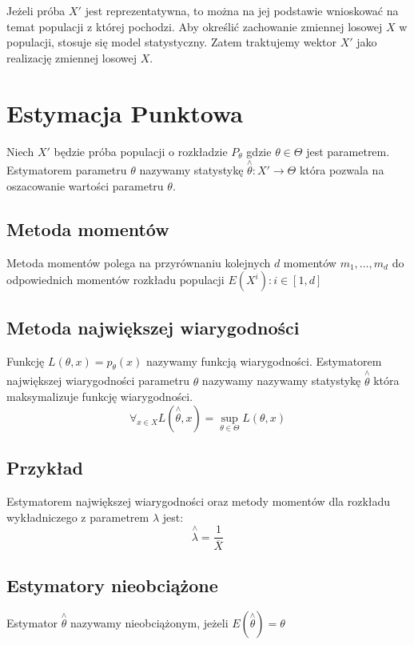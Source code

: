 \documentclass{../notatki}
\begin{document}
Jeżeli próba $X'$ jest reprezentatywna, to można na jej podstawie
wnioskować na temat populacji z której pochodzi. Aby określić zachowanie
zmiennej losowej $X$ w populacji, stosuje się model statystyczny.
Zatem traktujemy wektor $X'$ jako realizację zmiennej losowej $X$.

\section{Estymacja Punktowa}

Niech $X'$ będzie próba populacji o rozkładzie $P_\theta$ gdzie
$\theta \in \Theta$ jest parametrem. Estymatorem parametru $\theta$
nazywamy statystykę $\stackrel{\wedge}{\theta}: X' \rightarrow
\Theta$ która pozwala na
oszacowanie wartości parametru $\theta$.

\subsection{Metoda momentów}

Metoda momentów polega na przyrównaniu kolejnych $d$ momentów $m_1, \dots, m_d$
do odpowiednich momentów rozkładu populacji $E(X^i): i \in [1, d]$

\subsection{Metoda największej wiarygodności}

Funkcję $L(\theta, x) = p_\theta(x)$ nazywamy funkcją wiarygodności. Estymatorem
największej wiarygodności parametru $\theta$ nazywamy nazywamy statystykę
$\stackrel{\wedge}{\theta}$ która maksymalizuje funkcję wiarygodności.
$$
\forall_{x \in X} L(\stackrel{\wedge}{\theta}, x) = \sup_{\theta \in
\Theta} L(\theta, x)
$$

\subsection{Przykład}

Estymatorem największej wiarygodności oraz metody momentów dla rozkładu
wykładniczego z parametrem $\lambda$ jest:
$$
\stackrel{\wedge}{\lambda} = \frac{1}{\overline{X}}
$$

\subsection{Estymatory nieobciążone}

Estymator $\stackrel{\wedge}{\theta}$ nazywamy nieobciążonym, jeżeli
$E(\stackrel{\wedge}{\theta}) = \theta$
\end{document}
